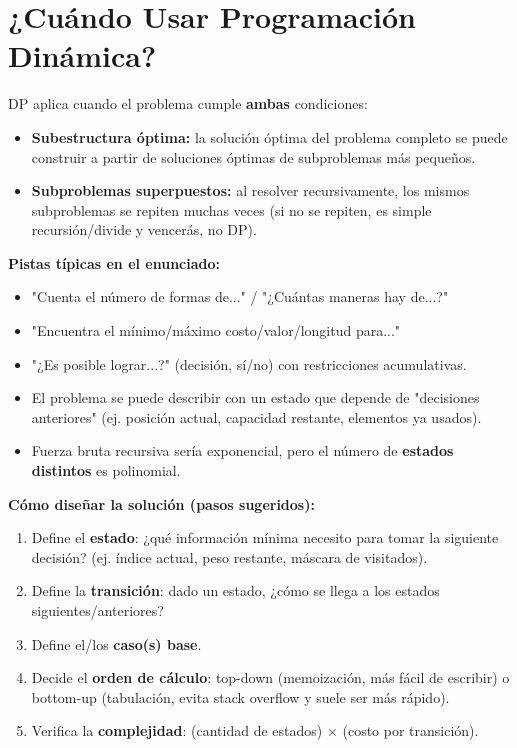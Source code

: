 \documentclass[10pt,twocolumn,letterpaper]{report}
\begin{document}
\section{¿Cuándo Usar Programación Dinámica?}
DP aplica cuando el problema cumple \textbf{ambas} condiciones:
\begin{itemize}
    \item \textbf{Subestructura óptima:} la solución óptima del problema completo se puede construir a partir de soluciones óptimas de subproblemas más pequeños.
    \item \textbf{Subproblemas superpuestos:} al resolver recursivamente, los mismos subproblemas se repiten muchas veces (si no se repiten, es simple recursión/divide y vencerás, no DP).
\end{itemize}
\textbf{Pistas típicas en el enunciado:}
\begin{itemize}
    \item "Cuenta el número de formas de..." / "¿Cuántas maneras hay de...?"
    \item "Encuentra el mínimo/máximo costo/valor/longitud para..."
    \item "¿Es posible lograr...?" (decisión, sí/no) con restricciones acumulativas.
    \item El problema se puede describir con un estado que depende de "decisiones anteriores" (ej. posición actual, capacidad restante, elementos ya usados).
    \item Fuerza bruta recursiva sería exponencial, pero el número de \textbf{estados distintos} es polinomial.
\end{itemize}
\textbf{Cómo diseñar la solución (pasos sugeridos):}
\begin{enumerate}
    \item Define el \textbf{estado}: ¿qué información mínima necesito para tomar la siguiente decisión? (ej. índice actual, peso restante, máscara de visitados).
    \item Define la \textbf{transición}: dado un estado, ¿cómo se llega a los estados siguientes/anteriores?
    \item Define el/los \textbf{caso(s) base}.
    \item Decide el \textbf{orden de cálculo}: top-down (memoización, más fácil de escribir) o bottom-up (tabulación, evita stack overflow y suele ser más rápido).
    \item Verifica la \textbf{complejidad}: (cantidad de estados) $\times$ (costo por transición).
\end{enumerate}
\end{document}
